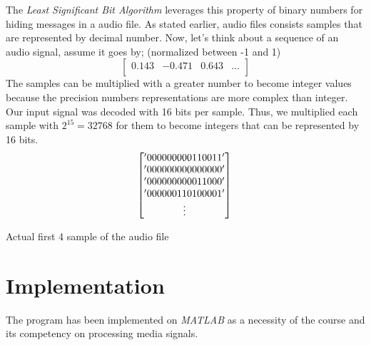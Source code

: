 \documentclass[twocolumns]{IEEEtran}
\begin{document}
	The \textit{Least Significant Bit Algorithm} leverages this property of binary numbers for hiding messages in a audio file. As stated earlier, audio files consists samples that are represented by decimal number. Now, let's think about a sequence of an audio signal, assume it goes by; (normalized between -1 and 1)\\
	\begin{equation}
	\begin{bmatrix}
		0.143 & -0.471 & 0.643 & \hdots \\
	\end{bmatrix}
	\end{equation}
	The samples can be multiplied with a greater number to become integer values because the precision numbers representations are more complex than integer. Our input signal was decoded with 16 bits per sample. Thus, we multiplied each sample with $2^{15} = 32768$ for them to become integers that can be represented by 16 bits.
	\begin{equation}
		\begin{bmatrix}
		'000000000110011' \\
		'000000000000000' \\
		'000000000011000' \\
		'000000110100001' \\
		\vdots
		\end{bmatrix} \\ \\		
	\end{equation}
	\begin{center}
		Actual first 4 sample of the audio file
	\end{center}

	
	\section{Implementation}
	The program has been implemented on \textit{MATLAB} as a necessity of the course and its competency on processing media signals.
	
	
	
\end{document}
